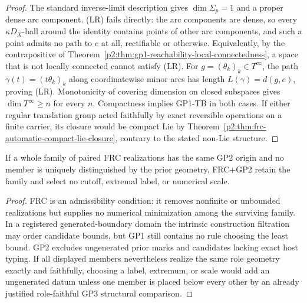 \documentclass[11pt,a4paper]{article}
\begin{document}
\begin{proof}
The standard inverse-limit description \cite{HewittRoss1979} gives
\(\dim\Sigma_p=1\) and a proper dense arc component.  (LR) fails directly: the
arc components are dense, so every \(\kappa D_X\)-ball around the identity
contains points of other arc components, and such a point admits no path to
\(e\) at all, rectifiable or otherwise.  Equivalently, by the contrapositive of
Theorem~\ref{p2:thm:gp1-reachability-local-connectedness}, a space that is not
locally connected cannot satisfy (LR).  For \(g=(\theta_k)_k\in T^\infty\), the path
\(\gamma(t)=(t\theta_k)_k\) along coordinatewise minor arcs has length
\(L(\gamma)=d(g,e)\), proving (LR).  Monotonicity of covering dimension on
closed subspaces \cite{HurewiczWallman1941} gives \(\dim T^\infty\ge n\) for
every \(n\).  Compactness
implies GP1-TB in both cases.  If either regular translation group acted
faithfully by exact reversible operations on a finite carrier, its closure
would be compact Lie by
Theorem~\ref{p2:thm:frc-automatic-compact-lie-closure}, contrary to the stated
non-Lie structure.
\end{proof}


\begin{corollary}
\label{p2:cor:gp1-gp2-no-family-member}
If a whole family of paired FRC realizations has the same GP2 origin and no
member is uniquely distinguished by the prior geometry, FRC+GP2 retain the
family and select no cutoff, extremal label, or numerical scale.
\end{corollary}

\begin{proof}
FRC is an admissibility condition: it removes nonfinite or unbounded
realizations but supplies no numerical minimization among the surviving
family.  In a registered generated-boundary domain the intrinsic construction
filtration may order candidate bounds, but GP1 still contains no rule choosing
the least bound.  GP2 excludes ungenerated prior marks and candidates lacking
exact host typing.  If all displayed members nevertheless realize the same
role geometry exactly and faithfully, choosing a label, extremum, or scale
would add an ungenerated datum unless one member is placed below every other
by an already justified role-faithful GP3 structural comparison.
\end{proof}
\end{document}
